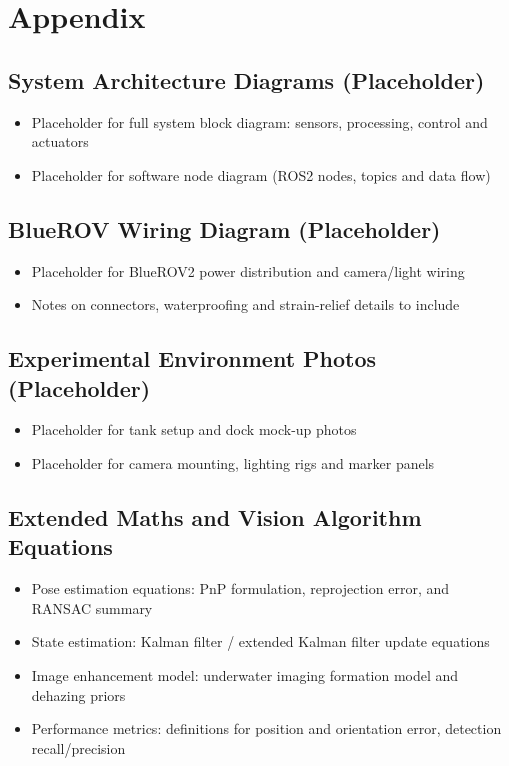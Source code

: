 \section*{Appendix}

\subsection*{System Architecture Diagrams (Placeholder)}
\begin{itemize}
    \item Placeholder for full system block diagram: sensors, processing, control and actuators
    \item Placeholder for software node diagram (ROS2 nodes, topics and data flow)
\end{itemize}

\subsection*{BlueROV Wiring Diagram (Placeholder)}
\begin{itemize}
    \item Placeholder for BlueROV2 power distribution and camera/light wiring
    \item Notes on connectors, waterproofing and strain-relief details to include
\end{itemize}

\subsection*{Experimental Environment Photos (Placeholder)}
\begin{itemize}
    \item Placeholder for tank setup and dock mock-up photos
    \item Placeholder for camera mounting, lighting rigs and marker panels
\end{itemize}

\subsection*{Extended Maths and Vision Algorithm Equations}
\begin{itemize}
    \item Pose estimation equations: PnP formulation, reprojection error, and RANSAC summary
    \item State estimation: Kalman filter / extended Kalman filter update equations
    \item Image enhancement model: underwater imaging formation model and dehazing priors
    \item Performance metrics: definitions for position and orientation error, detection recall/precision
\end{itemize}

